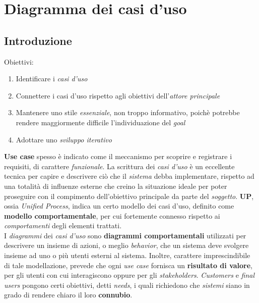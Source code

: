 \documentclass{article}
\begin{document}
\pagestyle{empty}

\section*{Diagramma dei casi d'uso}
\large
\subsection*{Introduzione}
Obiettivi:
\begin{enumerate}
    \renewcommand{\labelenumi}{-}
    \itemsep0em
    \item Identificare i \textit{casi d'uso}
    \item Connettere i casi d'uso rispetto agli obiettivi dell'\textit{attore principale}
    \item Mantenere uno stile \textit{essenziale}, non troppo informativo, poichè potrebbe rendere maggiormente difficile l'individuazione del \textit{goal}
    \item Adottare uno \textit{sviluppo iterativo} 
\end{enumerate}
\textbf{Use case} spesso è indicato come il meccanismo per scoprire e registrare i requisiti, di carattere \textit{funzionale}. La scrittura dei \textit{casi d'uso} è un eccellente tecnica per capire e descrivere ciò che il \textit{sistema} debba implementare, rispetto ad una totalità di influenze esterne che creino la situazione ideale per poter proseguire con il compimento dell'obiettivo principale da parte del \textit{soggetto}.
\textbf{UP}, ossia \textit{Unified Process}, indica un certo modello dei casi d'uso, definito come \textbf{modello comportamentale}, per cui fortemente connesso rispetto ai \textit{comportamenti} degli elementi trattati.\vspace*{14pt}\\
I \textit{diagrammi} dei \textit{casi d'uso} sono \textbf{diagrammi comportamentali} utilizzati per descrivere un insieme di azioni, o meglio \textit{behavior}, che un sistema deve svolgere insieme ad uno o più utenti esterni al sistema. Inoltre, carattere imprescindibile di tale modellazione, prevede che ogni \textit{use case} fornisca un \textbf{risultato di valore}, per gli utenti con cui interagiscono oppure per gli \textit{stakeholders}. \textit{Customers} e \textit{final users} pongono certi obiettivi, detti \textit{needs}, i quali richiedono che \textit{sistemi} siano in grado di rendere chiaro il loro \textbf{connubio}.\vspace*{14pt}\\
\end{document}
